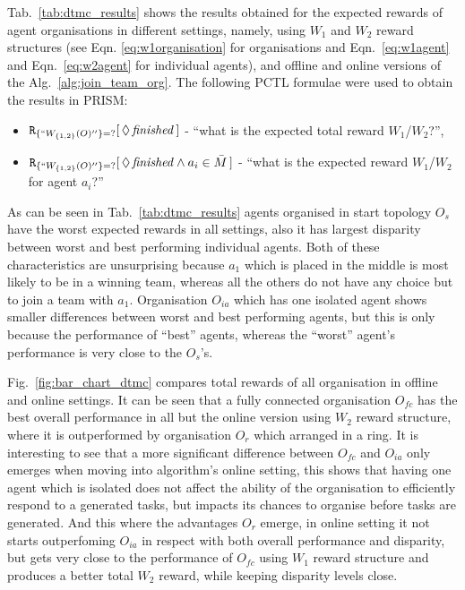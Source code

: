 \documentclass{llncs}
\begin{document}
Tab.~\ref{tab:dtmc_results} shows the results obtained for the expected rewards of agent organisations in different settings, namely, using $W_1$ and $W_2$ reward structures (see Eqn. \eqref{eq:w1organisation} %
for organisations and Eqn.~\eqref{eq:w1agent} and Eqn.~\eqref{eq:w2agent} for individual agents), and offline and online versions of the Alg.~\ref{alg:join_team_org}. The following PCTL formulae were used to obtain the results in PRISM:
\begin{itemize}
 \item ${\tt R}_{\{``W_{\{1,2\}}(O)''\}=?}[\,\Diamond\,\mathit{finished}\,]$ -
``what is the expected total reward $W_1$/$W_2$?'',
 \item ${\tt R}_{\{``W_{\{1,2\}}(O)''\}=?}[\,\Diamond\,\mathit{finished} \wedge a_i \in \bar{M} \,]$ -
``what is the expected reward $W_1$/$W_2$ for agent $a_i$?''
\end{itemize}

As can be seen in Tab.~\ref{tab:dtmc_results} agents organised in start topology $O_s$ have the worst expected rewards in all settings, also it has largest disparity between worst and best performing individual agents. Both of these characteristics are unsurprising because $a_1$ which is placed in the middle is most likely to be in a winning team, whereas all the others do not have any choice but to join a team with $a_1$. Organisation $O_{ia}$ which has one isolated agent shows smaller differences between worst and best performing agents, but this is only because the performance of ``best'' agents, whereas the ``worst'' agent's performance is very close to the $O_s$'s.

Fig.~\ref{fig:bar_chart_dtmc} compares total rewards of all organisation in offline and online settings. It can be seen that a fully connected organisation $O_{fc}$ has the best overall performance in all but the online version using $W_2$ reward structure, where it is outperformed by organisation $O_r$ which arranged in a ring. It is interesting to see that a more significant difference between $O_{fc}$ and $O_{ia}$ only emerges when moving into algorithm's online setting, this shows that having one agent which is isolated does not affect the ability of the organisation to efficiently respond to a generated tasks, but impacts its chances to organise before tasks are generated. And this where the advantages $O_r$ emerge, in online setting it not starts outperfoming $O_{ia}$ in respect with both overall performance and disparity, but gets very close to the performance of $O_{fc}$ using $W_1$ reward structure and produces a better total $W_2$ reward, while keeping disparity levels close.
\end{document}
